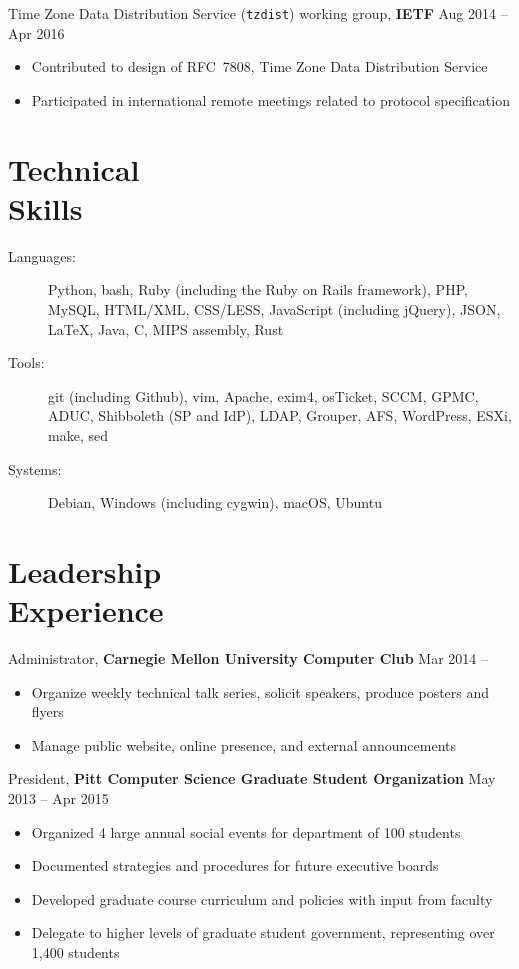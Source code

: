 \documentclass[11pt]{article}
\newcommand{\textdb}[1]{\fontseries{db}\selectfont#1\normalfont}
\newcommand{\present}{\phantom{Xxx 20XX}}
\newcommand{\itemizeonly}{\leavevmode\par\vspace{\dimexpr-\baselineskip-\parskip}}
\begin{document}
\textdb{
Time Zone Data Distribution Service (\texttt{tzdist}) working group,
\textbf{IETF}
	\hfill Aug 2014 -- Apr 2016
}
\begin{itemize}
	\item Contributed to design of RFC~7808, Time Zone Data Distribution Service
	\item Participated in international remote meetings related to protocol specification
\end{itemize}



\section{Technical\\ Skills}

\itemizeonly
\begin{description}
	\item[\textdb{Languages:}] Python, bash, Ruby (including the Ruby on Rails framework), PHP, MySQL,
		HTML/XML, CSS/LESS, JavaScript (including jQuery), JSON,
		\LaTeX, Java, C, MIPS assembly, Rust
	\item[\textdb{Tools:}] git (including Github), vim, Apache, exim4, osTicket,
		SCCM, GPMC, ADUC, Shibboleth (SP and IdP),
		LDAP, Grouper, AFS, WordPress, ESXi, make, sed
	\item[\textdb{Systems:}] Debian, Windows (including cygwin), macOS, Ubuntu
\end{description}



\section{Leadership\\ Experience}

\textdb{
Administrator,
\textbf{Carnegie Mellon University Computer Club}
	\hfill Mar 2014 -- \present
}
\begin{itemize}
	\item Organize weekly technical talk series, solicit speakers, produce posters and flyers
	\item Manage public website, online presence, and external announcements
\end{itemize}

\textdb{
President,
\textbf{Pitt Computer Science Graduate Student Organization}
	\hfill May 2013 -- Apr 2015
}
\begin{itemize}
	\item Organized 4 large annual social events for department of 100 students
	\item Documented strategies and procedures for future executive boards
	\item Developed graduate course curriculum and policies with input from faculty
	\item Delegate to higher levels of graduate student government,
		representing over 1,400 students
\end{itemize}
\end{document}
